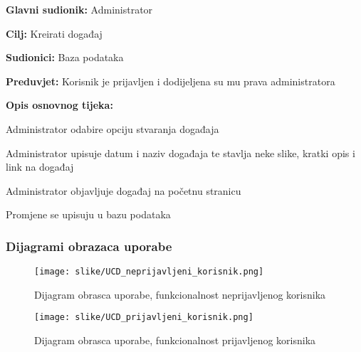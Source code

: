 				\noindent {}
					\begin{packed_item}
	
						\item \textbf{Glavni sudionik: }Administrator
						\item  \textbf{Cilj:} Kreirati događaj
						\item  \textbf{Sudionici:} Baza podataka
						\item  \textbf{Preduvjet:} Korisnik je prijavljen i dodijeljena su mu prava administratora
						\item  \textbf{Opis osnovnog tijeka:}
						
						\item[] \begin{packed_enum}
	
							\item Administrator odabire opciju stvaranja događaja
							\item Administrator upisuje datum i naziv događaja te stavlja neke slike, kratki opis i link na događaj
							\item Administrator objavljuje događaj na početnu stranicu
							\item Promjene se upisuju u bazu podataka

						\end{packed_enum}	
					\end{packed_item}
					
				\eject
				
					
				\subsubsection{Dijagrami obrazaca uporabe}
					

				\begin{figure}[H]
					\texttt{[image: slike/UCD\_neprijavljeni\_korisnik.png]}
					\centering
					\caption{Dijagram obrasca uporabe, funkcionalnost neprijavljenog korisnika}
					\label{fig:neprijavljeni_korisnik}
				\end{figure}
				
				\begin{figure}[H]
					\texttt{[image: slike/UCD\_prijavljeni\_korisnik.png]}
					\centering
					\caption{Dijagram obrasca uporabe, funkcionalnost prijavljenog korisnika}
					\label{fig:prijavljeni_korisnik}
				\end{figure}
				
